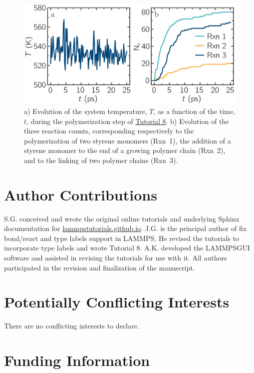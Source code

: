 \documentclass[9pt,tutorial]{livecoms}
\newcommand{\lmpcmd}[1]{\hspace{0pt}\colorbox{listing}{\textcolor{command}{\small{#1}}}\hspace{0pt}} %
\newcommand{\lammpsgui}{\textsf{LAMMPS\textendash GUI}}
\begin{document}
\begin{figure}
\centering
\includegraphics[width=\linewidth]{REACT-reacting}
\caption{a) Evolution of the system temperature, $T$,
as a function of the time, $t$, during the polymerization step of
\hyperref[bond-react-label]{Tutorial 8}.
b) Evolution of the three reaction counts, corresponding respectively to
the polymerization of two styrene monomers (Rxn~1), the  addition of a styrene
monomer to the end of a growing polymer chain (Rxn~2), and to the linking
of two polymer chains (Rxn~3).}
\label{fig:evolution-reacting}
\end{figure}

\section*{Author Contributions}

S.G. conceived and wrote the original online tutorials and underlying Sphinx documentation
for \href{https://lammpstutorials.github.io}{lammpstutorials.github.io}.
J.G. is the principal author of \lmpcmd{fix bond/react} and \lmpcmd{type labels}
support in LAMMPS.  He revised the tutorials to incorporate type labels and wrote Tutorial 8.
A.K. developed the \lammpsgui{} software and assisted in revising the
tutorials for use with it.  All authors participated in the revision and finalization
of the manuscript.

\section*{Potentially Conflicting Interests}

There are no conflicting interests to declare.

\section*{Funding Information}
\end{document}
